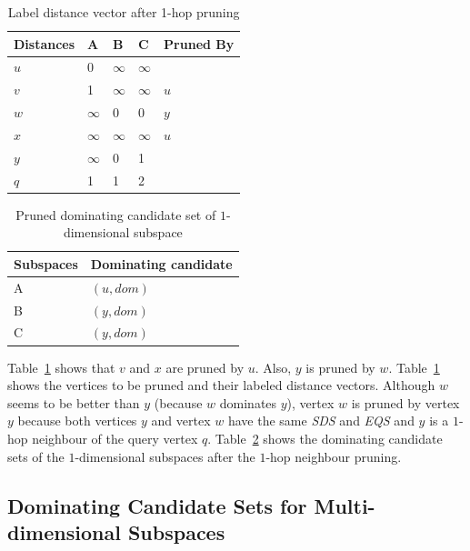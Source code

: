 \begin{table}[h]
    \centering
    \begin{tabular}{lllll}
    \hline
    Distances & A & B & C & Pruned By\\ \hline
    $u$       & 0 & $\infty$ & $\infty$ &\\ \hline
    $v$       & 1 & $\infty$ & $\infty$ & $u$\\ \hline
    $w$       & $\infty$ & 0 & 0 & $y$\\ \hline
    $x$       & $\infty$ & $\infty$ & $\infty$ & $u$\\ \hline
    $y$       & $\infty$ & 0 & 1 & \\ \hline
    $q$       & 1 & 1 & 2 &\\ \hline
    \end{tabular}
    \caption{Label distance vector after 1-hop pruning}
    \label{tab:lv_pruned}
\end{table}

\begin{table}[H]
    \centering
    \begin{tabular}{|l|l|}
    \hline
    Subspaces & Dominating candidate \\ \hline
    A         & $(u, dom)$            \\ \hline
    B         & $(y, dom)$            \\ \hline
    C         & $(y, dom)$            \\ \hline
    \end{tabular}
    \caption{Pruned dominating candidate set of $1$-dimensional subspace}
    \label{tab:dom_cand_pruned}
\end{table}

Table~\ref{tab:lv_pruned} shows that $v$ and $x$ are pruned by $u$. Also, $y$ is pruned by $w$. Table~\ref{tab:lv_pruned} shows the vertices to be pruned and their labeled distance vectors. Although $w$ seems to be better than $y$ (because $w$ dominates $y$), vertex $w$ is pruned by vertex $y$ because both vertices $y$ and vertex $w$ have the same \emph{SDS} and \emph{EQS} and $y$ is a $1$-hop neighbour of the query vertex $q$. Table~\ref{tab:dom_cand_pruned} shows the dominating candidate sets of the $1$-dimensional subspaces after the $1$-hop neighbour pruning.

\subsection{Dominating Candidate Sets for Multi-dimensional Subspaces}

